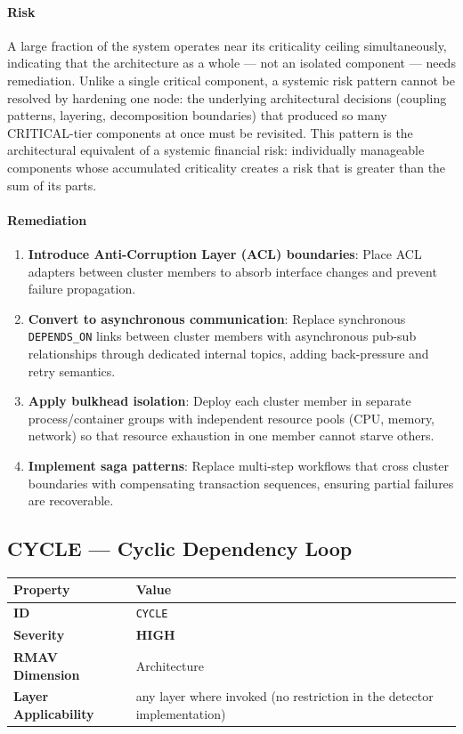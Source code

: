 \documentclass[11pt]{article}
\makeatletter
\newcommand{\HIGH}{\textcolor{orange!80!black}{\textbf{HIGH}}}
\newcommand{\patternprop}[4]{%
  \begin{center}
  \begin{tabular}{@{}ll@{}}
  \toprule
  \textbf{Property} & \textbf{Value} \\
  \midrule
  \textbf{ID} & \texttt{#1} \\
  \textbf{Severity} & #2 \\
  \textbf{RMAV Dimension} & #3 \\
  \textbf{Layer Applicability} & #4 \\
  \bottomrule
  \end{tabular}
  \end{center}
}
\makeatother
\begin{document}
\paragraph{Risk}
A large fraction of the system operates near its criticality ceiling simultaneously, indicating that the architecture as a whole --- not an isolated component --- needs remediation. Unlike a single critical component, a systemic risk pattern cannot be resolved by hardening one node: the underlying architectural decisions (coupling patterns, layering, decomposition boundaries) that produced so many CRITICAL-tier components at once must be revisited. This pattern is the architectural equivalent of a systemic financial risk: individually manageable components whose accumulated criticality creates a risk that is greater than the sum of its parts.

\paragraph{Remediation}
\begin{enumerate}[leftmargin=*]
\item \textbf{Introduce Anti-Corruption Layer (ACL) boundaries}: Place ACL adapters between cluster members to absorb interface changes and prevent failure propagation.
\item \textbf{Convert to asynchronous communication}: Replace synchronous \texttt{DEPENDS\_ON} links between cluster members with asynchronous pub-sub relationships through dedicated internal topics, adding back-pressure and retry semantics.
\item \textbf{Apply bulkhead isolation}: Deploy each cluster member in separate process/container groups with independent resource pools (CPU, memory, network) so that resource exhaustion in one member cannot starve others.
\item \textbf{Implement saga patterns}: Replace multi-step workflows that cross cluster boundaries with compensating transaction sequences, ensuring partial failures are recoverable.
\end{enumerate}

\subsection{CYCLE --- Cyclic Dependency Loop}
\patternprop{CYCLE}{\HIGH}{Architecture}{any layer where invoked (no restriction in the detector implementation)}
\end{document}
